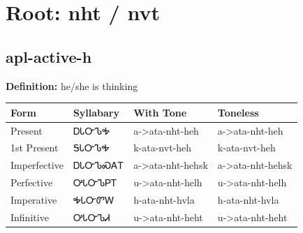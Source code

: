 \documentclass{article}%
\begin{document}
%
\normalsize%
\section*{Root: nht / nvt}%
\subsection*{apl-active-h}%
\textbf{Definition: }%
he/she is thinking%
\\[0.5em]%
\begin{tabular}{|l|l|l|l|}%
\hline%
\textbf{Form}&\textbf{Syllabary}&\textbf{With Tone}&\textbf{Toneless}\\%
\hline%
Present&ᎠᏓᏅᏖᎭ&a{-}>ata{-}nht{-}heh&a{-}>ata{-}nht{-}heh\\%
1st Present&ᎦᏓᏅᏖᎭ&k{-}ata{-}nvt{-}heh&k{-}ata{-}nvt{-}heh\\%
Imperfective&ᎠᏓᏅᏖᏍᎪᎢ&a{-}>ata{-}nht{-}hehsk&a{-}>ata{-}nht{-}hehsk\\%
Perfective&ᎤᏓᏅᏖᏢᎢ&u{-}>ata{-}nht{-}helh&u{-}>ata{-}nht{-}helh\\%
Imperative&ᎭᏓᏅᏛᎳ&h{-}ata{-}nht{-}hvla&h{-}ata{-}nht{-}hvla\\%
Infinitive&ᎤᏓᏅᏖᏗ&u{-}>ata{-}nht{-}heht&u{-}>ata{-}nht{-}heht\\%
\hline%
\end{tabular}%
\\[1em]%
\end{document}
